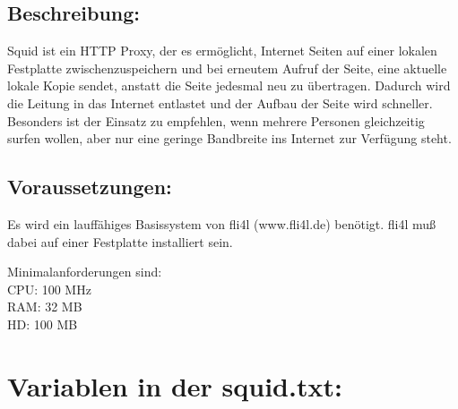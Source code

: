
\subsection{Beschreibung:}
Squid ist ein HTTP Proxy, der es ermöglicht, Internet Seiten auf einer lokalen
Festplatte zwischenzuspeichern und bei erneutem Aufruf der Seite, eine
aktuelle lokale Kopie sendet, anstatt die Seite jedesmal neu zu übertragen.
Dadurch wird die Leitung in das Internet entlastet und der Aufbau der Seite
wird schneller. Besonders ist der Einsatz zu empfehlen, wenn mehrere Personen
gleichzeitig surfen wollen, aber nur eine geringe Bandbreite ins Internet zur
Verfügung steht.

\subsection{Voraussetzungen:}
Es wird ein lauffähiges Basissystem von fli4l (www.fli4l.de) benötigt. fli4l
muß dabei auf einer Festplatte installiert sein.

Minimalanforderungen sind:\\
CPU: 100 MHz\\
RAM:  32 MB\\
HD:  100 MB


\section{Variablen in der squid.txt:}

